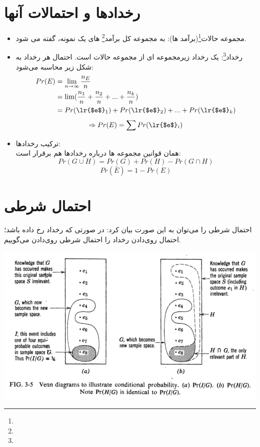 \documentclass[12pt,onecolumn,a4paper]{article}
\begin{document}
\section{رخدادها و احتمالات آنها}
\begin{itemize}
    \item مجموعه حالات\footnote{}(برآمد ها): 
        به مجموعه کل برآمد\footnote{} های یک نمونه، گفته می شود.
    \item رخداد\footnote{}: یک رخداد زیرمجموعه ای از مجموعه حالات است. احتمال هر رخداد به شکل زیر محاسبه می‌شود:
        \begin{align*}
            Pr(E) &= \lim_{n\rightarrow\infty}{\dfrac{n_E}{n}} \\
            &= \lim(\dfrac{n_1}{n}+\dfrac{n_2}{n}+...+\dfrac{n_k}{n}) \\
            &= Pr(\text{\lr{$e$}}_1)+Pr(\text{\lr{$e$}}_2)+...+Pr(\text{\lr{$e$}}_k) 
        \end{align*}
        \begin{equation}
            \Rightarrow Pr(E) = \sum Pr(\text{\lr{$e$}}_i)
        \end{equation}
    \item ترکیب رخدادها: \\ 
        همان قوانین مجموعه ها درباره رخدادها هم برقرار است:
        \begin{equation}
            Pr(G\cup H)=Pr(G)+Pr(H)-Pr(G\cap H)
        \end{equation}
         \begin{equation}
            Pr(\bar{E}) = 1 - Pr(E) 
         \end{equation}
\end{itemize}

\section{احتمال شرطی}
احتمال شرطی را می‌توان به این صورت بیان کرد: در صورتی که رخداد  رخ داده باشد؛ احتمال روی‌دادن رخداد  را احتمال شرطی روی‌دادن  می‌گوییم.

\includegraphics[width=\textwidth]{fig1.png} \\
\end{document}
